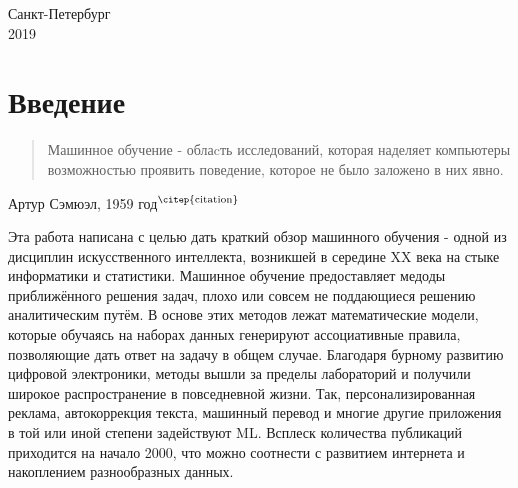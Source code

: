 \documentclass{article}
\begin{document}
    
    \vfill 
    \begin{center} Санкт-Петербург\\ 2019 \end{center}

\newpage


\section*{Введение}
    
    \begin{quote}
        \begin{flushright}
            Машинное обучение - облаcть исследований, которая наделяет компьютеры возможностью проявить поведение, которое не было заложено в них явно. \\
        \end{flushright}
    \end{quote} 
    
    \begin{flushright}
        Артур Сэмюэл, 1959 год$^\text{\citep{citation}}$
    \end{flushright}
    
    Эта работа написана с целью дать краткий обзор машинного обучения - одной из дисциплин искусственного интеллекта, возникшей в середине XX века на стыке информатики и статистики.
    Машинное обучение предоставляет медоды приближённого решения задач,  плохо или совсем не поддающиеся решению аналитическим путём. В основе этих методов лежат математические модели, которые обучаясь на наборах данных генерируют ассоциативные правила, позволяющие дать ответ на задачу в общем случае. Благодаря бурному развитию цифровой электроники, методы вышли за пределы лабораторий и получили широкое распространение в повседневной жизни. Так, персонализированная реклама, автокоррекция текста, машинный перевод и многие другие приложения в той или иной степени задействуют ML. Всплеск количества публикаций приходится на начало 2000, что можно соотнести с развитием интернета и накоплением разнообразных данных. 
    \hfill \break
    \hfill \break
    \hfill \break
    \hfill \break
    
\end{document}
